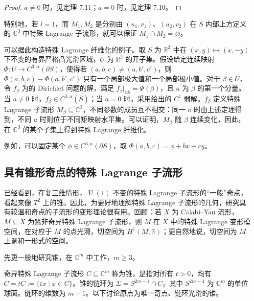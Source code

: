 \begin{proof}
$a\neq0$ 时，见定理 7.11；$a=0$ 时，见定理 7.10。
\end{proof}

特别地，若 $l=1$，而 $M_1,M_2$ 是分别由 $(u_1,v_1)$、$(u_2,v_2)$ 在 $S$ 内部上方定义的 $\mathbb C^3$ 中特殊 Lagrange 子流形，就可以保证 $M_1\cap M_2=\varnothing$。

可以据此构造特殊 Lagrange 纤维化的例子。取 $S$ 为 $\mathbb R^2$ 中在 $(x,y)\mapsto(x,-y)$ 下不变的有界严格凸光滑区域，$U$ 为 $\mathbb R^3$ 的开子集。假设给定连续映射 $\Phi\colon U\to C^{3,\alpha}(\partial S)$，使得若 $(a,b,c)\neq(a,b',c')$，则 $\Phi(a,b,c)-\Phi(a,b',c')$ 只有一个局部极大值和一个局部极小值。对于 $\beta\in U$，令 $f_\beta$ 为的 Dirichlet 问题的解，满足 $f_\beta|_{\partial S}=\Phi(\beta)$，且 $a$ 为 $\beta$ 的第一个分量。当 $a\neq0$ 时，$f_\beta\in C^{3,\alpha}(\overline S)$；当 $a=0$ 时，采用给出的 $C^1$ 弱解。$f_\beta$ 定义特殊 Lagrange 子流形 $M_\beta\subseteq\mathbb C^3$，不同参数的成员互不相交：同一 $a$ 时由上述定理得到，不同 $a$ 时则位于不同矩映射水平集。可以证明，$M_\beta$ 随 $\beta$ 连续变化，因此，在 $\mathbb C^3$ 的某个子集上得到特殊 Lagrange 纤维化。

例如，可以固定某个 $\phi\in C^{3,\alpha}(\partial S)$，取 $\Phi(a,b,c)=\phi+bx+cy$。

\subsection{具有锥形奇点的特殊 Lagrange 子流形}\label{sec:7.2.5}

已经看到，在复三维情形，$\operatorname U(1)$ 不变的特殊 Lagrange 子流形的“一般”奇点，看起来像 $T^2$ 上的锥。因此，为更好地理解特殊 Lagrange 子流形的几何，研究具有较温和奇点的子流形的变形理论很有用。回顾：若 $X$ 为 Calabi--Yau 流形，$M\subseteq X$ 为紧非奇异特殊 Lagrange 子流形，则 $M$ 在 $X$ 中的特殊 Lagrange 变形模空间，在对应于 $M$ 的点光滑，切空间为 $H^1(M,\mathbb R)$；更自然地说，切空间为 $M$ 上调和一形式的空间。

先更一般地研究锥，在 $\mathbb C^m$ 中工作，$m\geq3$。
\begin{definition*}
奇异特殊 Lagrange 子流形 $C\subseteq\mathbb C^m$ 称为锥，是指对所有 $t>0$，均有 $C=tC:=\{tx\mid x\in C\}$。锥的链环为 $\Sigma=S^{2m-1}\cap C$，其中 $S^{2m-1}$ 为 $\mathbb C^m$ 的单位球面。链环的维数为 $m-1$。以下讨论原点为唯一奇点、链环光滑的锥。
\end{definition*}

